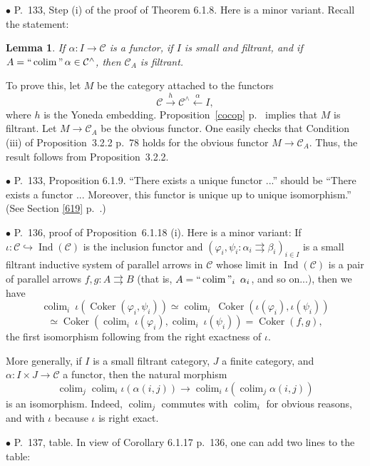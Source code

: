 \documentclass[12pt]{article}
\newtheorem{lem}[thm]{Lemma}
\theoremstyle{remark}%
\newcommand{\bu}{\bullet}
\newcommand{\n}{\noindent}
\newcommand{\C}{\mathcal C}
\newcommand{\p}{\varphi}
\newcommand{\pa}{\rightrightarrows}
\newcommand{\pf}{\n{\em Proof. }}
\newcommand{\bl}{\begin{lem}}
\newcommand{\el}{\end{lem}}
\newcommand{\pr}{Proposition}
\DeclareMathOperator*{\coli}{colim}
\DeclareMathOperator*{\co}{colim}
\DeclareMathOperator*{\ic}{``\coli"}
\DeclareMathOperator{\Coker}{Coker}
\DeclareMathOperator{\Ind}{Ind}
\begin{document}

\n$\bu$ P.~133, Step (i) of the proof of Theorem 6.1.8. Here is a minor variant. Recall the statement: 
%
\bl 
If $\alpha:I\to\C$ is a functor, if $I$ is small and filtrant, and if $A=\ic\alpha\in\C^\wedge$, then $\C_A$ is filtrant. 
\el 
% 
\pf To prove this, let $M$ be the category attached to the functors 
$$
\C\xrightarrow h\C^\wedge\xleftarrow\alpha I,
$$ 
where $h$ is the Yoneda embedding. \pr\ \ref{cocop} p.~\pageref{cocop} implies that $M$ is filtrant. Let $M\to\C_A$ be the obvious functor. One easily checks that Condition (iii) of \pr\ 3.2.2 p.~78 holds for the obvious functor $M\to\C_A$. Thus, the result follows from \pr\ 3.2.2. 


\n$\bu$ P.~133, Proposition 6.1.9. ``There exists a unique functor ...'' should be ``There exists a functor ... Moreover, this functor is unique up to unique isomorphism.'' (See Section \ref{619} p.~\pageref{619}.) 


\n$\bu$ P.~136, proof of \pr\ 6.1.18 (i). Here is a minor variant: If $\iota:\C\hookrightarrow\Ind(\C)$ is the inclusion functor and $(\p_i,\psi_i:\alpha_i\pa\beta_i)_{i\in I}$ is a small filtrant inductive system of parallel arrows in $\C$ whose limit in $\Ind(\C)$ is a pair of parallel arrows $f,g:A\pa B$ (that is, $A=\ic_i\ \alpha_i$, and so on...), then we have 
$$
\co_i\ \iota(\Coker(\p_i,\psi_i))\simeq
\co_i\ \Coker(\iota(\p_i),\iota(\psi_i))
$$
$$
\simeq
\Coker(\co_i\ \iota(\p_i),\co_i\ \iota(\psi_i))=
\Coker(f,g),
$$ 
the first isomorphism following from the right exactness of $\iota$. 

More generally, if $I$ is a small filtrant category, $J$ a finite category, and $\alpha:I\times J\to\C$ a functor, then the natural morphism 
$$
\co_j\co_i\iota(\alpha(i,j))\to\co_i\iota\left(\co_j\alpha(i,j)\right) 
$$ 
is an isomorphism. Indeed, $\co_j$ commutes with $\co_i$ for obvious reasons, and with $\iota$ because $\iota$ is right exact. 


\n$\bu$ P.~137, table. In view of Corollary 6.1.17 p.~136, one can add two lines to the table:\bigskip 
\end{document}
